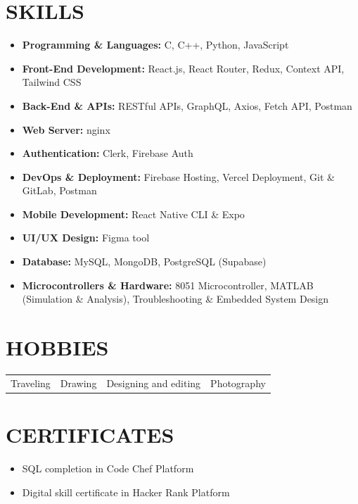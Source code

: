 \documentclass[a4paper,11pt]{article}
\begin{document}
\section{SKILLS}
\begin{itemize}
    \item \textbf{Programming \& Languages:} C, C++, Python, JavaScript
    \item \textbf{Front-End Development:} React.js, React Router, Redux, Context API, Tailwind CSS
    \item \textbf{Back-End \& APIs:} RESTful APIs, GraphQL, Axios, Fetch API, Postman
    \item \textbf{Web Server:} nginx
    \item \textbf{Authentication:} Clerk, Firebase Auth
    \item \textbf{DevOps \& Deployment:} Firebase Hosting, Vercel Deployment, Git \& GitLab, Postman
    \item \textbf{Mobile Development:} React Native CLI \& Expo
    \item \textbf{UI/UX Design:} Figma tool
    \item \textbf{Database:} MySQL, MongoDB, PostgreSQL (Supabase)
    \item \textbf{Microcontrollers \& Hardware:} 8051 Microcontroller, MATLAB (Simulation \& Analysis), Troubleshooting \& Embedded System Design
\end{itemize}

\section{HOBBIES}
\begin{tabularx}{\textwidth}{X X X X}
    Traveling & Drawing & Designing and editing & Photography \\
\end{tabularx}

\section{CERTIFICATES}
\begin{itemize}
    \item SQL completion in Code Chef Platform
    \item Digital skill certificate in Hacker Rank Platform
\end{itemize}
\end{document}
